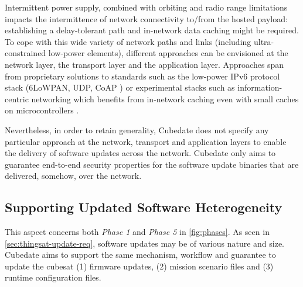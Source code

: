 Intermittent power supply, combined with orbiting and radio range limitations impacts the intermittence of network connectivity to/from the hosted payload: establishing a delay-tolerant path and in-network data caching might be required.
To cope with this wide variety of network paths and links (including ultra-constrained low-power elements), different approaches can be envisioned at the network layer, the transport layer and the application layer. Approaches span from proprietary solutions to standards such as the low-power IPv6 protocol stack (6LoWPAN, UDP, CoAP \cite{morabito2020ietf}) or experimental stacks such as information-centric networking which benefits from in-network caching even with small caches on microcontrollers \cite{hahm2017low}. 

Nevertheless, in order to retain generality, Cubedate does not specify any particular approach at the network, transport and application layers to enable the delivery of software updates across the network.
Cubedate only aims to guarantee end-to-end security properties for the software update binaries that are delivered, somehow, over the network.

\subsection{Supporting Updated Software Heterogeneity}
This aspect concerns both \textit{Phase 1} and \textit{Phase 5} in \autoref{fig:phases}. 
As seen in \autoref{sec:thingsat-update-req}, software updates may be of various nature and size.
Cubedate aims to support the same mechanism, workflow and guarantee to update the cubesat (1) firmware updates, (2) mission scenario files and (3) runtime configuration files.

